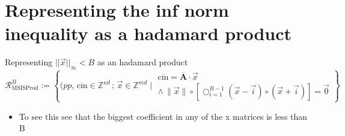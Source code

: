 \section{Representing the inf norm inequality as a hadamard product}
\begin{frame}{Representing $||\overrightarrow{x}||_{\infty} < B$ as an hadamard product}
    \[
        \mathcal{R}^B_{\text{MSISProd}} :=
        \left\{ (pp, \, \overline{\text{cm}} \in \mathbb{Z}^{\kappa d}\, ;\, \overrightarrow{x}  \in \mathbb{Z}^{md} \mid
        \begin{array}{c}
            \overline{\text{cm}} = \overline{\mathbf{A}} \cdot \overrightarrow{x} \\
            \land \, \| \overrightarrow{x} \| \circ \left[\bigcirc^{B-1}_{i=1} (\overrightarrow{x} - \overrightarrow{i}) \circ (\overrightarrow{x} + \overrightarrow{i}) \right]= \overrightarrow{0}
        \end{array}
        \right\}
    \]

    \begin{itemize}
        \item To see this see that the biggest coefficient in any of the x matrices is less than B
    \end{itemize}
\end{frame}